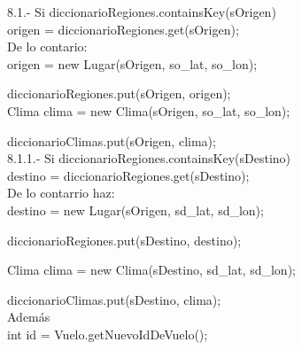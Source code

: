 \documentclass[30pt]{article}
\theoremstyle{definition}
\begin{document}
    \hspace{3cm} 8.1.- Si diccionarioRegiones.containsKey(sOrigen)\\
    
    \hspace{4cm} origen = diccionarioRegiones.get(sOrigen);\\
    
    \hspace{5cm} De lo contario:\\
    
    \hspace{5cm} origen = new Lugar(sOrigen, so\_lat, so\_lon);
                
  \hspace{5cm} diccionarioRegiones.put(sOrigen, origen);\\

  \hspace{5cm} Clima clima = new Clima(sOrigen, so\_lat, so\_lon);
        
  \hspace{5cm} diccionarioClimas.put(sOrigen, clima);\\
  
    \hspace{4cm} 8.1.1.- Si diccionarioRegiones.containsKey(sDestino)\\
    
    \hspace{5cm} destino = diccionarioRegiones.get(sDestino);\\
    
    \hspace{5cm} De lo contarrio haz:\\
    
    \hspace{5cm} destino = new Lugar(sOrigen, sd\_lat, sd\_lon);
                
  \hspace{5cm} diccionarioRegiones.put(sDestino, destino);

  \hspace{5cm} Clima clima = new Clima(sDestino, sd\_lat, sd\_lon);
        
  \hspace{5cm} diccionarioClimas.put(sDestino, clima);\\
    
    \hspace{2cm} Además\\
    
    \hspace{2cm} int id = Vuelo.getNuevoIdDeVuelo();
    
\end{document}
